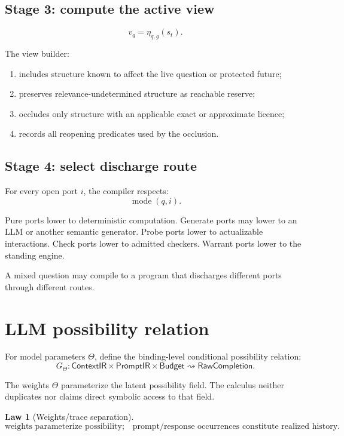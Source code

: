 \documentclass[11pt,oneside]{article}
\newtheorem{law}[definition]{Law}
\newcommand{\PromptIR}{\mathsf{PromptIR}}
\begin{document}
\subsection{Stage 3: compute the active view}

\[
v_q=\eta_{q,g}(s_t).
\]

The view builder:
\begin{enumerate}
\item includes structure known to affect the live question or protected future;
\item preserves relevance-undetermined structure as reachable reserve;
\item occludes only structure with an applicable exact or approximate licence;
\item records all reopening predicates used by the occlusion.
\end{enumerate}

\subsection{Stage 4: select discharge route}

For every open port \(i\), the compiler respects:
\[
\operatorname{mode}(q,i).
\]

Pure ports lower to deterministic computation.  Generate ports may lower to an LLM or another semantic generator.  Probe ports lower to actualizable interactions.  Check ports lower to admitted checkers.  Warrant ports lower to the standing engine.

A mixed question may compile to a program that discharges different ports through different routes.

\section{LLM possibility relation}

For model parameters \(\Theta\), define the binding-level conditional possibility relation:
\[
\boxed{
G_\Theta:
\mathsf{ContextIR}
\times
\PromptIR
\times
\mathsf{Budget}
\rightsquigarrow
\mathsf{RawCompletion}.
}
\]

The weights \(\Theta\) parameterize the latent possibility field.  The calculus neither duplicates nor claims direct symbolic access to that field.

\begin{law}[Weights/trace separation]
\[
\boxed{
\text{weights parameterize possibility;}
\quad
\text{prompt/response occurrences constitute realized history.}
}
\]
\end{law}
\end{document}
